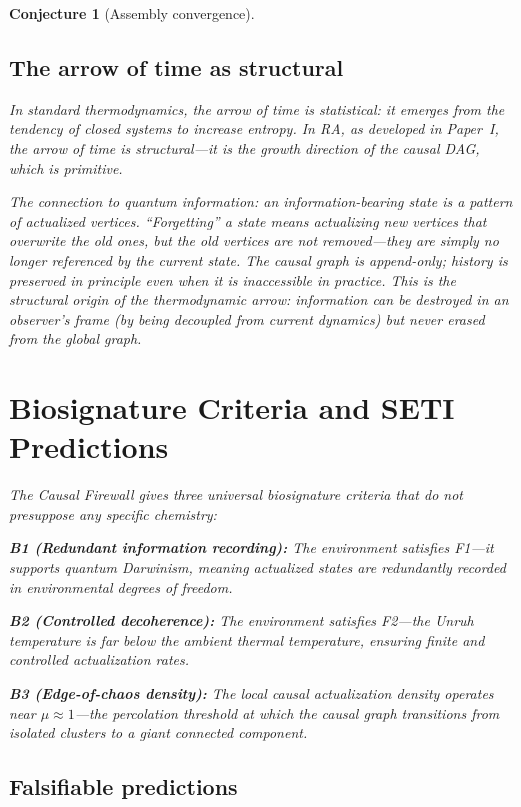 \documentclass[11pt]{article}
\newtheorem{conjecture}{Conjecture}
\begin{document}
\begin{conjecture}[Assembly convergence]
\subsection{The arrow of time as structural}
\label{sec:qinfo_arrow}

In standard thermodynamics, the arrow of time is statistical: it emerges from the tendency of closed systems to increase entropy. In RA, as developed in Paper~I, the arrow of time is structural---it is the growth direction of the causal DAG, which is primitive.

The connection to quantum information: an information-bearing state is a pattern of actualized vertices. ``Forgetting'' a state means actualizing new vertices that overwrite the old ones, but the old vertices are not removed---they are simply no longer referenced by the current state. The causal graph is append-only; history is preserved in principle even when it is inaccessible in practice. This is the structural origin of the thermodynamic arrow: information can be destroyed in an observer's frame (by being decoupled from current dynamics) but never erased from the global graph.

\section{Biosignature Criteria and SETI Predictions}
\label{sec:seti}

The Causal Firewall gives three universal biosignature criteria that do not presuppose any specific chemistry:

\textbf{B1 (Redundant information recording):} The environment satisfies F1---it supports quantum Darwinism, meaning actualized states are redundantly recorded in environmental degrees of freedom.

\textbf{B2 (Controlled decoherence):} The environment satisfies F2---the Unruh temperature is far below the ambient thermal temperature, ensuring finite and controlled actualization rates.

\textbf{B3 (Edge-of-chaos density):} The local causal actualization density operates near $\mu\approx 1$---the percolation threshold at which the causal graph transitions from isolated clusters to a giant connected component.

\subsection{Falsifiable predictions}


\end{conjecture}
\end{document}
